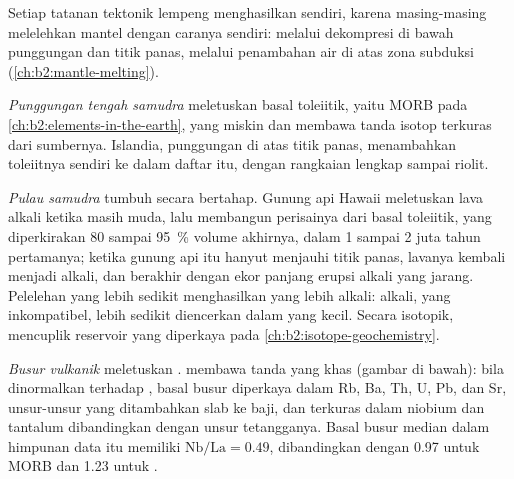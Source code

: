Setiap tatanan tektonik lempeng menghasilkan  sendiri, karena masing-masing melelehkan
mantel dengan caranya sendiri: melalui dekompresi di bawah punggungan dan titik panas, melalui penambahan air
di atas zona subduksi (\cref{ch:b2:mantle-melting}).

\emph{Punggungan tengah samudra} meletuskan basal toleiitik, yaitu MORB pada
\cref{ch:b2:elements-in-the-earth}, yang miskin  dan membawa
tanda isotop terkuras dari sumbernya. Islandia, punggungan di atas titik panas, menambahkan
toleiitnya sendiri ke dalam daftar itu, dengan rangkaian lengkap sampai riolit.

\emph{Pulau samudra} tumbuh secara bertahap. Gunung api Hawaii meletuskan lava alkali ketika
masih muda, lalu membangun perisainya dari basal toleiitik, yang diperkirakan 80 sampai
\qty{95}{\percent} volume akhirnya, dalam 1 sampai 2 juta tahun pertamanya; ketika
gunung api itu hanyut menjauhi titik panas, lavanya kembali menjadi alkali, dan berakhir dengan ekor panjang
erupsi alkali yang jarang. Pelelehan yang lebih sedikit menghasilkan  yang lebih alkali: alkali, yang
inkompatibel, lebih sedikit diencerkan dalam  yang kecil. Secara isotopik,  mencuplik reservoir yang diperkaya pada \cref{ch:b2:isotope-geochemistry}.

\emph{Busur vulkanik} meletuskan .  membawa
tanda yang khas (gambar di bawah): bila dinormalkan terhadap , basal
busur diperkaya dalam Rb, Ba, Th, U, Pb, dan Sr, unsur-unsur yang ditambahkan slab ke
baji, dan terkuras dalam niobium dan tantalum dibandingkan dengan unsur tetangganya. Basal busur
median dalam himpunan data itu memiliki $\mathrm{Nb}/\mathrm{La} = 0.49$, dibandingkan dengan 0.97 untuk MORB
dan 1.23 untuk .


